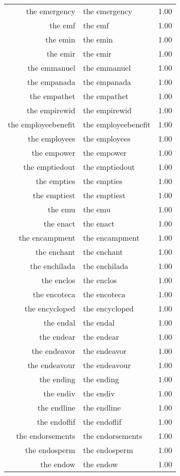 \begin{table}[ht]
\begin{tabular}{rlr}
  the emergency & the emergency & 1.00 \\ 
  the emf & the emf & 1.00 \\ 
  the emin & the emin & 1.00 \\ 
  the emir & the emir & 1.00 \\ 
  the emmanuel & the emmanuel & 1.00 \\ 
  the empanada & the empanada & 1.00 \\ 
  the empathet & the empathet & 1.00 \\ 
  the empirewid & the empirewid & 1.00 \\ 
  the employeebenefit & the employeebenefit & 1.00 \\ 
  the employees & the employees & 1.00 \\ 
  the empower & the empower & 1.00 \\ 
  the emptiedout & the emptiedout & 1.00 \\ 
  the empties & the empties & 1.00 \\ 
  the emptiest & the emptiest & 1.00 \\ 
  the emu & the emu & 1.00 \\ 
  the enact & the enact & 1.00 \\ 
  the encampment & the encampment & 1.00 \\ 
  the enchant & the enchant & 1.00 \\ 
  the enchilada & the enchilada & 1.00 \\ 
  the enclos & the enclos & 1.00 \\ 
  the encoteca & the encoteca & 1.00 \\ 
  the encycloped & the encycloped & 1.00 \\ 
  the endal & the endal & 1.00 \\ 
  the endear & the endear & 1.00 \\ 
  the endeavor & the endeavor & 1.00 \\ 
  the endeavour & the endeavour & 1.00 \\ 
  the ending & the ending & 1.00 \\ 
  the endiv & the endiv & 1.00 \\ 
  the endline & the endline & 1.00 \\ 
  the endoflif & the endoflif & 1.00 \\ 
  the endorsements & the endorsements & 1.00 \\ 
  the endosperm & the endosperm & 1.00 \\ 
  the endow & the endow & 1.00 \\ 

\end{tabular}
\end{table}
